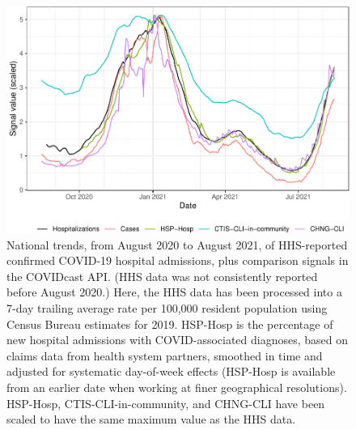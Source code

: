 \documentclass[9pt,twoside,lineno]{pnas-new}
\begin{document}
\begin{figure}

{\centering \includegraphics[width=\textwidth]{fig/hospitalization_time_trends_national-1} 

}

\caption{National trends, from August 2020 to August 2021, of HHS-reported confirmed COVID-19 hospital admissions, plus comparison signals in the COVIDcast API. (HHS data was not consistently reported before August 2020.) Here, the HHS data has been processed into a 7-day trailing average rate per 100,000 resident population using Census Bureau estimates for 2019. HSP-Hosp is the percentage of new hospital admissions with COVID-associated diagnoses, based on claims data from health system partners, smoothed in time and adjusted for systematic day-of-week effects (HSP-Hosp is available from an earlier date when working at finer geographical resolutions). HSP-Hosp, CTIS-CLI-in-community, and CHNG-CLI have been scaled to have the same maximum value as the HHS data.}\label{fig:hospitalization_time_trends_national}
\end{figure}

\clearpage
\end{document}
